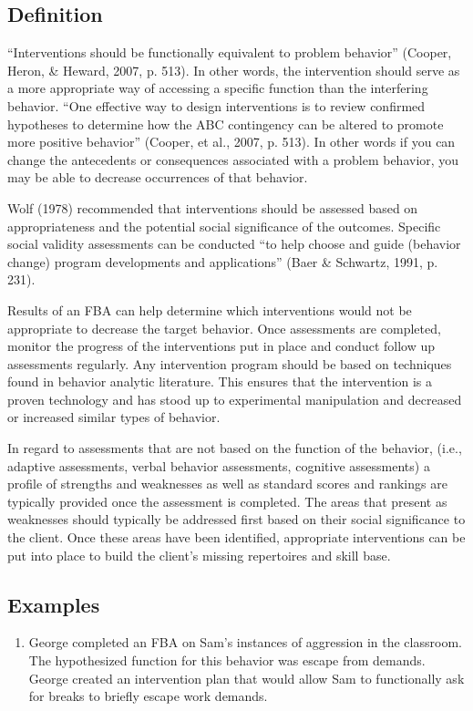 \subsection{Definition}
``Interventions should be functionally equivalent to problem behavior'' (Cooper, Heron, \& Heward, 2007, p. 513). In other words, the intervention should serve as a more appropriate way of accessing a specific function than the interfering behavior. ``One effective way to design interventions is to review confirmed hypotheses to determine how the ABC contingency can be altered to promote more positive behavior'' (Cooper, et al., 2007, p. 513).  In other words if you can change the antecedents or consequences associated with a problem behavior, you may be able to decrease occurrences of that behavior. 

Wolf (1978) recommended that interventions should be assessed based on appropriateness and the potential social significance of the outcomes. Specific social validity assessments can be conducted ``to help choose and guide (behavior change) program developments and applications'' (Baer \& Schwartz, 1991, p. 231).

Results of an FBA can help determine which interventions would not be appropriate to decrease the target behavior. Once assessments are completed, monitor the progress of the interventions put in place and conduct follow up assessments regularly. Any intervention program should be based on techniques found in behavior analytic literature. This ensures that the intervention is a proven technology and has stood up to experimental manipulation and decreased or increased similar types of behavior.

In regard to assessments that are not based on the function of the behavior, (i.e., adaptive assessments, verbal behavior assessments, cognitive assessments) a profile of strengths and weaknesses as well as standard scores and rankings are typically provided once the assessment is completed. The areas that present as weaknesses should typically be addressed first based on their social significance to the client. Once these areas have been identified, appropriate interventions can be put into place to build the client's missing repertoires and skill base. 
 
\subsection{Examples}
\begin{enumerate}
\item George completed an FBA on Sam's instances of aggression in the classroom. The hypothesized function for this behavior was escape from demands. George created an intervention plan that would allow Sam to functionally ask for breaks to briefly escape work demands. 
\end{enumerate}
%
